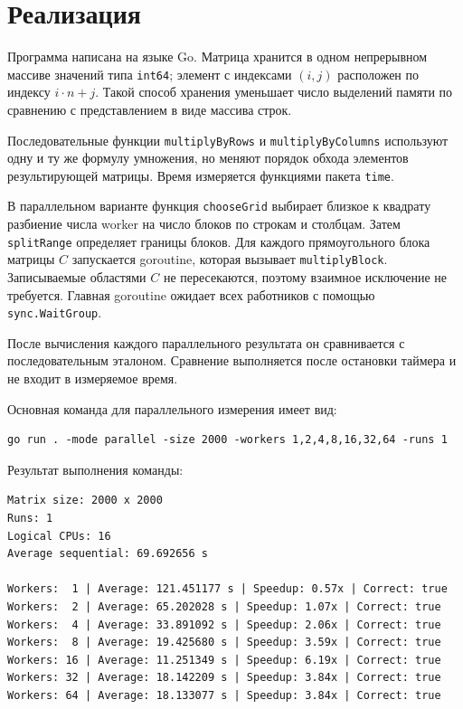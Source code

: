 \documentclass[a4paper,14pt]{extarticle}
\begin{document}
\section{Реализация}

Программа написана на языке Go. Матрица хранится в одном непрерывном массиве
значений типа \texttt{int64}; элемент с индексами $(i, j)$ расположен по
индексу $i \cdot n + j$. Такой способ хранения уменьшает число выделений памяти
по сравнению с представлением в виде массива строк.

Последовательные функции \texttt{multiplyByRows} и
\texttt{multiplyByColumns} используют одну и ту же формулу умножения, но
меняют порядок обхода элементов результирующей матрицы. Время измеряется
функциями пакета \texttt{time}.

В параллельном варианте функция \texttt{chooseGrid} выбирает близкое к квадрату
разбиение числа worker на число блоков по строкам и столбцам. Затем
\texttt{splitRange} определяет границы блоков. Для каждого прямоугольного блока
матрицы $C$ запускается goroutine, которая вызывает \texttt{multiplyBlock}.
Записываемые областями $C$ не пересекаются, поэтому взаимное исключение не
требуется. Главная goroutine ожидает всех работников с помощью
\texttt{sync.WaitGroup}.

После вычисления каждого параллельного результата он сравнивается с
последовательным эталоном. Сравнение выполняется после остановки таймера и не
входит в измеряемое время.

Основная команда для параллельного измерения имеет вид:
\begin{lstlisting}[language={},caption={Команда запуска измерения}]
go run . -mode parallel -size 2000 -workers 1,2,4,8,16,32,64 -runs 1
\end{lstlisting}

Результат выполнения команды:
\begin{lstlisting}[language={},caption={Вывод программы для матриц 2000 x 2000}]
Matrix size: 2000 x 2000
Runs: 1
Logical CPUs: 16
Average sequential: 69.692656 s

Workers:  1 | Average: 121.451177 s | Speedup: 0.57x | Correct: true
Workers:  2 | Average: 65.202028 s | Speedup: 1.07x | Correct: true
Workers:  4 | Average: 33.891092 s | Speedup: 2.06x | Correct: true
Workers:  8 | Average: 19.425680 s | Speedup: 3.59x | Correct: true
Workers: 16 | Average: 11.251349 s | Speedup: 6.19x | Correct: true
Workers: 32 | Average: 18.142209 s | Speedup: 3.84x | Correct: true
Workers: 64 | Average: 18.133077 s | Speedup: 3.84x | Correct: true
\end{lstlisting}
\end{document}
